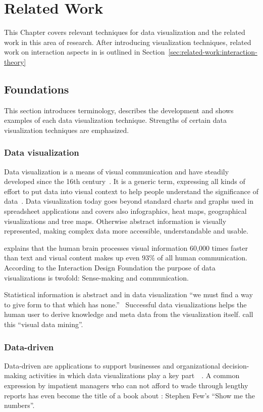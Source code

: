 \chapter{Related Work}\label{sec:related-work}

This Chapter covers relevant techniques for data visualization and the related work in this area of research.
After introducing visualization techniques, related work on interaction aspects in \cmvs{} is outlined in Section~\ref{sec:related-work:interaction-theory}

\section{Foundations}\label{sec:related-work:foundations}
This section introduces terminology, describes the development and shows examples of each data visualization technique.
Strengths of certain data visualization techniques are emphasized.

\subsection{Data visualization}
Data visualization is a means of visual communication and have steadily developed since the 16th century~\cite{Friendly2001}.
It is a generic term, expressing all kinds of effort to put data into visual context to help people understand the significance of data~\cite{Rose2017}.
Data visualization today goes beyond standard charts and graphs used in spreadsheet applications and covers also infographics, heat maps, geographical visualizations and tree maps.
Otherwise abstract information is visually represented, making complex data more accessible, understandable and usable.

\textcite{Kusinitz2014} explains that the human brain processes visual information 60,000 times faster than text and visual content makes up even 93\% of all human communication.
According to the Interaction Design Foundation the purpose of data visualizations is twofold:
Sense-making and communication.

Statistical information is abstract and in data visualization ``we must find a way to give form to that which has none.''~\cite{Few2013}
Successful data visualizations helps the human user to derive knowledge and meta data from the visualization itself.
\textcite{Nocke2002} call this ``visual data mining''.

\subsection{Data-driven \dss{}}
Data-driven \dss{} are applications to support businesses and organizational decision-making activities in which data visualizations play a key part~\cite{Nada2007}~\cite{Poleto2015}.
A common expression by impatient managers who can not afford to wade through lengthy reports has even become the title of a book about \dss{}:
Stephen Few's ``Show me the numbers''.

